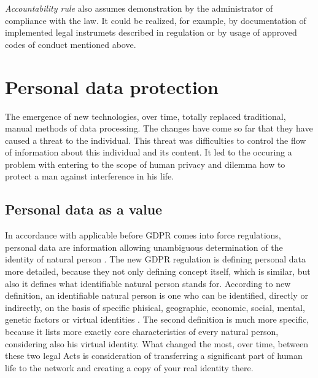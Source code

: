 \documentclass[en, noamssymb]{mgr}
\begin{document}
\indent \textit{Accountability rule} also assumes demonstration by the administrator of compliance with the law. It could be realized, for example, by documentation of implemented legal instrumets described in regulation or by usage of approved codes of conduct mentioned above.


\chapter{Personal data protection} \label{sec:sekcjaDaneOsobowe}

The emergence of new technologies, over time, totally replaced traditional, manual methods of data processing. The changes have come so far that they have caused a threat to the individual. This threat was difficulties to control the flow of information about this individual and its content. It led to the occuring a problem with entering to the scope of human privacy and dilemma how to protect a man against interference in his life.



\section{Personal data as a value}

In accordance with applicable before GDPR comes into force regulations, personal data are information allowing unambiguous determination of the identity of natural person \cite{uodo_art6}. The new GDPR regulation is defining personal data more detailed, because they not only defining concept itself, which is similar, but also it defines what identifiable natural person stands for. According to new definition, an identifiable natural person is one who can be identified, directly or indirectly, on the basis of specific phisical, geographic, economic, social, mental, genetic factors or virtual identities \cite{rodo_art4}. The second definition is much more specific, because it lists more exactly core characteristics of every natural person, considering also his virtual identity. What changed the most, over time, between these two legal Acts is consideration of transferring a significant part of human life to the network and creating a copy of your real identity there.
\end{document}
